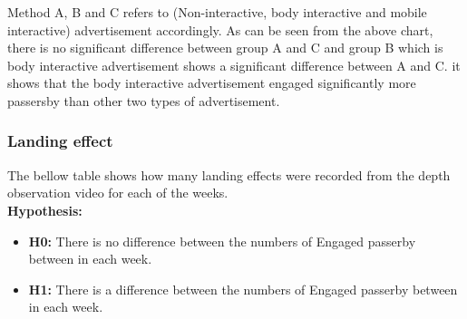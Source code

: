 \begin{table}[H]
\caption{Post-Hoc Tukey’s HSD}
\label{tab:engage-non-posthoctukey}
\centering
{}
\end{table}


Method A, B and C refers to (Non-interactive, body interactive and mobile interactive) advertisement accordingly. As can be seen from the above chart, there is no significant difference between group A and C and group B which is body interactive advertisement shows a significant difference between A and C. it shows that the body interactive advertisement engaged significantly more passersby than other two types of advertisement.


\subsubsection {Landing effect}
The bellow table shows how many landing effects were recorded from the depth observation video for each of the weeks.\\


\textbf{Hypothesis: }
\begin{itemize}
\item \textbf{H0:} There is no difference between the numbers of Engaged passerby between in each week.
\item \textbf{H1:} There is a difference between the numbers of Engaged passerby between in each week.
\end{itemize}

\begin{table}[H]
\caption{Number of Landing effect in three weeks}
\label{tab:landingeffectthreeweeks}
\centering
{}
\end{table}

